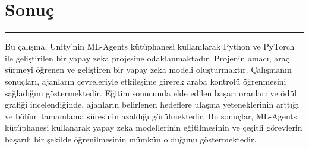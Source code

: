 \documentclass{article}
\begin{document}
\newpage

\section{Sonuç}
\rule{\textwidth}{0.5pt}
\par Bu çalışma, Unity'nin ML-Agents kütüphanesi kullanılarak Python ve PyTorch ile geliştirilen bir yapay zeka projesine odaklanmaktadır. Projenin amacı, araç sürmeyi öğrenen ve geliştiren bir yapay zeka modeli oluşturmaktır. Çalışmanın sonuçları, ajanların çevreleriyle etkileşime girerek araba kontrolü öğrenmesini sağladığını göstermektedir. Eğitim sonucunda elde edilen başarı oranları ve ödül grafiği incelendiğinde, ajanların belirlenen hedeflere ulaşma yeteneklerinin arttığı ve bölüm tamamlama süresinin azaldığı görülmektedir. Bu sonuçlar, ML-Agents kütüphanesi kullanarak yapay zeka modellerinin eğitilmesinin ve çeşitli görevlerin başarılı bir şekilde öğrenilmesinin mümkün olduğunu göstermektedir. 

\newpage



\end{document}
